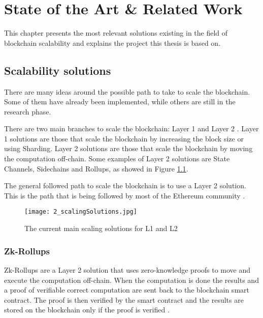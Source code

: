 \chapter{State of the Art \& Related Work\label{cha:chapter2}}

This chapter presents the most relevant solutions existing in the field of blockchain scalability and explains the project this thesis is based on.
\section{Scalability solutions}
There are many ideas around the possible path to take to scale the blockchain. Some of them have already been implemented, while others are still in the research phase.

There are two main branches to scale the blockchain: Layer 1 and Layer 2 \cite{tyagi_study_2021,thibault_blockchain_2022}. Layer 1 solutions are those that scale the blockchain by increasing the block size or using Sharding. Layer 2 solutions are those that scale the blockchain by moving the computation off-chain. Some examples of Layer 2 solutions are State Channels, Sidechains and Rollups, as showed in Figure \ref{fig:2_scalingSolutions}.

The general followed path to scale the blockchain is to use a Layer 2 solution. This is the path that is being followed by most of the Ethereum community \cite{neiheiser_practical_2023}.

\begin{figure}[ht]
  \centering
  \texttt{[image: 2\_scalingSolutions.jpg]}
  \caption[Scaling Solutions]{The current main scaling solutions for L1 and L2 \footnotemark}  
  \label{fig:2_scalingSolutions}
\end{figure} 

\subsection{Zk-Rollups}
Zk-Rollups are a Layer 2 solution that uses zero-knowledge proofs to move and execute the computation off-chain. When the computation is done the results and a proof of verifiable correct computation are sent back to the blockchain smart contract. The proof is then verified by the smart contract and the results are stored on the blockchain only if the proof is verified \cite{tyagi_study_2021}.

